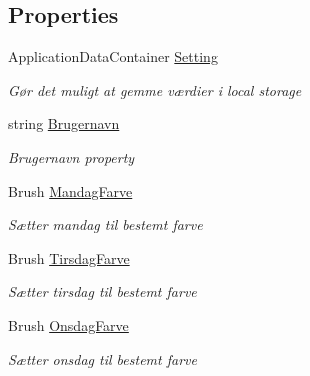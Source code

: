 \subsection*{Properties}
\begin{DoxyCompactItemize}
\item 
Application\+Data\+Container \hyperlink{class__1aarsproeve_1_1_view_model_1_1_vagtplan_view_model_aa5e675ea6389cdc802698037ced2e091}{Setting}
\begin{DoxyCompactList}\small\item\em Gør det muligt at gemme værdier i local storage \end{DoxyCompactList}\item 
string \hyperlink{class__1aarsproeve_1_1_view_model_1_1_vagtplan_view_model_a2bb8421c370d9ff0ff1776a1c239ba4e}{Brugernavn}
\begin{DoxyCompactList}\small\item\em Brugernavn property \end{DoxyCompactList}\item 
Brush \hyperlink{class__1aarsproeve_1_1_view_model_1_1_vagtplan_view_model_ad7b9435c1500a21d04418bedeead2094}{Mandag\+Farve}
\begin{DoxyCompactList}\small\item\em Sætter mandag til bestemt farve \end{DoxyCompactList}\item 
Brush \hyperlink{class__1aarsproeve_1_1_view_model_1_1_vagtplan_view_model_adc98e55c2f01916b7581f1ef865a70bc}{Tirsdag\+Farve}
\begin{DoxyCompactList}\small\item\em Sætter tirsdag til bestemt farve \end{DoxyCompactList}\item 
Brush \hyperlink{class__1aarsproeve_1_1_view_model_1_1_vagtplan_view_model_a3c463aaf64f3e35e910640a29969943d}{Onsdag\+Farve}
\begin{DoxyCompactList}\small\item\em Sætter onsdag til bestemt farve \end{DoxyCompactList}\item 

\end{DoxyCompactItemize}
